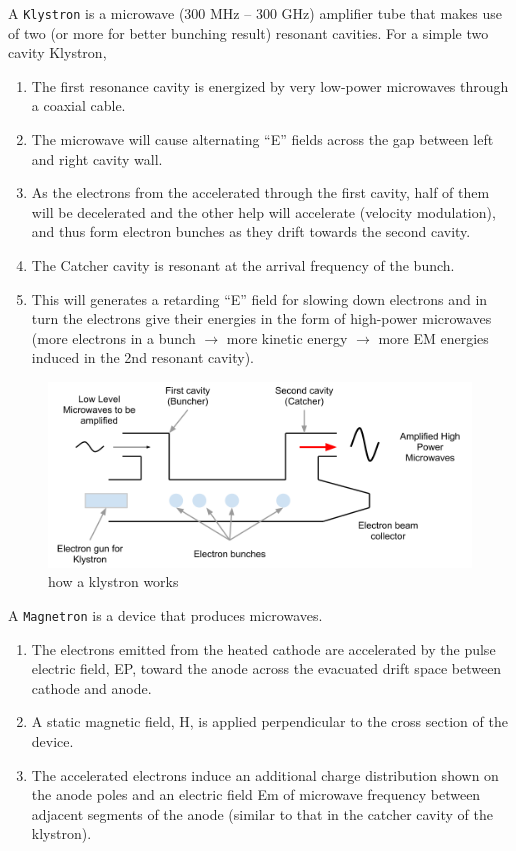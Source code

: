 \documentclass[]{book}
\providecommand{\tightlist}{%
  \setlength{\itemsep}{0pt}\setlength{\parskip}{0pt}}
\theoremstyle{definition}
\theoremstyle{definition}
\theoremstyle{definition}
\theoremstyle{remark}
\begin{document}
A \texttt{Klystron} is a microwave (300 MHz -- 300 GHz) amplifier tube
that makes use of two (or more for better bunching result) resonant
cavities. For a simple two cavity Klystron,

\begin{enumerate}
\def\labelenumi{\arabic{enumi}.}
\tightlist
\item
  The first resonance cavity is energized by very low-power microwaves
  through a coaxial cable.
\item
  The microwave will cause alternating ``E'' fields across the gap
  between left and right cavity wall.
\item
  As the electrons from the accelerated through the first cavity, half
  of them will be decelerated and the other help will accelerate
  (velocity modulation), and thus form electron bunches as they drift
  towards the second cavity.
\item
  The Catcher cavity is resonant at the arrival frequency of the bunch.
\item
  This will generates a retarding ``E'' field for slowing down electrons
  and in turn the electrons give their energies in the form of
  high-power microwaves (more electrons in a bunch \(\rightarrow\) more
  kinetic energy \(\rightarrow\) more EM energies induced in the 2nd
  resonant cavity).
\end{enumerate}

\begin{figure}

{\centering \includegraphics{figures/klystron} 

}

\caption{how a klystron works}\label{fig:unnamed-chunk-4}
\end{figure}

A \texttt{Magnetron} is a device that produces microwaves.

\begin{enumerate}
\def\labelenumi{\arabic{enumi}.}
\tightlist
\item
  The electrons emitted from the heated cathode are accelerated by the
  pulse electric field, EP, toward the anode across the evacuated drift
  space between cathode and anode.
\item
  A static magnetic field, H, is applied perpendicular to the cross
  section of the device.
\item
  The accelerated electrons induce an additional charge distribution
  shown on the anode poles and an electric field Em of microwave
  frequency between adjacent segments of the anode (similar to that in
  the catcher cavity of the klystron).
\end{enumerate}
\end{document}
